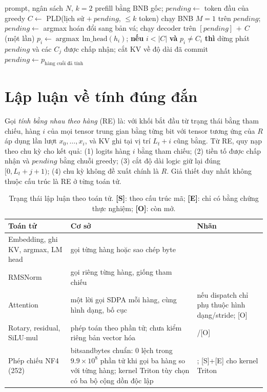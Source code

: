 \begin{algorithm}[t]
\caption{Một lượt sinh của B2 (rút gọn)}\label{alg:b2}
\begin{algorithmic}[1]
\Require prompt, ngân sách $N$, $k{=}2$
\State prefill bằng BNB gốc; $\mathit{pending}\gets$ token đầu của greedy
  \State $C\gets$ PLD(lịch sử $+\ \mathit{pending}$, $\le k$ token)
    \State chạy BNB $M{=}1$ trên $\mathit{pending}$; $\mathit{pending}\gets$ argmax
  \Else
    \State hoán đổi sang bản vá; chạy decoder trên $[\mathit{pending}]\,{+}\,C$ (một lần)
     
      \State $p_i\gets \operatorname{argmax}\,\mathrm{lm\_head}(h_i)$; \textbf{nếu} $i<|C|$ \textbf{và} $p_i\neq C_i$ \textbf{thì} dừng
    \EndFor
    \State phát $\mathit{pending}$ và các $C_j$ được chấp nhận; cắt KV về độ dài đã commit
    \State $\mathit{pending}\gets p_{\text{hàng cuối đã tính}}$
  \EndIf
\EndWhile
\end{algorithmic}
\end{algorithm}

\section{Lập luận về tính đúng đắn}\label{sec:argument}
Gọi \emph{tính bằng nhau theo hàng} (RE) là: với khối bắt đầu từ trạng thái bằng tham chiếu, hàng $i$ của mọi tensor trung gian bằng từng bit với tensor tương ứng của $R$ áp dụng lần lượt $x_0,\dots,x_i$, và KV ghi tại vị trí $L_t{+}i$ cũng bằng. Từ RE, quy nạp theo chu kỳ cho kết quả: (1) logits hàng $i$ bằng tham chiếu; (2) tiền tố được chấp nhận và $\mathit{pending}$ bằng chuỗi greedy; (3) cắt độ dài logic giữ lại đúng $[0,L_t{+}j{+}1)$; (4) chu kỳ không đề xuất chính là $R$. Giả thiết duy nhất không thuộc cấu trúc là RE ở từng toán tử.

\begin{table}[t]
\centering\small
\caption{Trạng thái lập luận theo toán tử. \textbf{[S]}: theo cấu trúc mã; \textbf{[E]}: chỉ có bằng chứng thực nghiệm; \textbf{[O]}: còn mở.}\label{tab:ops}
\begin{tabularx}{\textwidth}{@{}>{\raggedright\arraybackslash}p{}>{\raggedright\arraybackslash}X>{\raggedright\arraybackslash}p{}@{}}
\toprule
Toán tử & Cơ sở & Nhãn\\\midrule
Embedding, ghi KV, argmax, LM head & gọi từng hàng hoặc sao chép byte & [S]\\
RMSNorm & gọi riêng từng hàng, giống tham chiếu & [S]\\
Attention & một lời gọi SDPA mỗi hàng, cùng hình dạng, bố cục & [S] nếu dispatch chỉ phụ thuộc hình dạng/stride; [O]\\
Rotary, residual, SiLU$\cdot$mul & phép toán theo phần tử; chưa kiểm riêng bản vector hóa & [S]/[O]\\
Phép chiếu NF4 (252) & bitsandbytes chuẩn: $0$ lệch trong $9.9\times10^{8}$ phần tử khi gọi ba hàng so với từng hàng; kernel Triton tùy chọn có ba bộ cộng dồn độc lập & [E]; [S]+[E] cho kernel Triton\\
\bottomrule
\end{tabularx}
\end{table}

